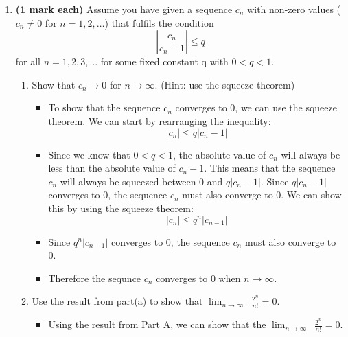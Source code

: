 \documentclass[12pt]{report}
\begin{document}
\begin{enumerate}[leftmargin=\labelsep]
    \item {\bf (1 mark each)} Assume you have given a sequence $c_n$ with non-zero values ($c_n\neq0$ for $n=1,2,\dots$) that fulfils the condition
        \begin{equation}
            \left|\frac{c_n}{c_n-1}\right|\leq q
        \end{equation} for all $n=1,2,3,\dots$ for some fixed constant q with $0<q<1$.
        \begin{enumerate}
            \item Show that $c_n\to0$ for $n\to \infty$. (Hint: use the squeeze theorem)
                \begin{tcolorbox}
                    \begin{itemize}[label={}]
                        \item To show that the sequence $c_n$ converges to 0, we can use the squeeze theorem. We can start by rearranging the inequality:
                        \begin{equation*}
                            |c_n| \leq q|c_n-1|
                        \end{equation*}
                        \item Since we know that $0<q<1$, the absolute value of $c_n$ will always be less than the absolute value of $c_n-1$. This means that the sequence $c_n$ will always be squeezed between 0 and $q|c_n-1|$. Since $q|c_n-1|$ converges to 0, the sequence $c_n$ must also converge to 0. We can show this by using the squeeze theorem:
                        \begin{equation*}
                            |c_n| \leq q^n|c_{n-1}|
                        \end{equation*}
                        \item Since $q^n|c_{n-1}|$ converges to 0, the sequence $c_n$ must also converge to 0.
                        \item Therefore the sequnce $c_n$ converges to 0 when $n\to \infty$.
                    \end{itemize}
                \end{tcolorbox}
            \item Use the result from part(a) to show that $\displaystyle{\lim_{n \to \infty}}\,\,\, \frac{2^n}{n!}=0$.
                \begin{tcolorbox}
                    \begin{itemize}[label={}]
                        \item Using the result from Part A, we can show that the $\displaystyle{\lim_{n \to \infty}}\,\,\, \frac{2^n}{n!}=0$.

\end{itemize}
\end{tcolorbox}
\end{enumerate}
\end{enumerate}
\end{document}

